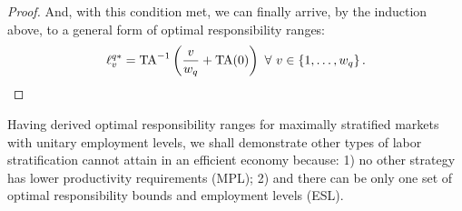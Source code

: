 \documentclass[hidelinks, nonatbib]{elsarticle}
\begin{document}
\begin{lemma}
\begin{proof}
        And, with this condition met, we can finally arrive, by the induction above, to a general form of optimal responsibility ranges:
        \begin{gather}
        \ell_{v}^{q*}
        =
        \text{TA}^{-1}\left(
            \frac{v}{w_q}
            +
            \text{TA}(0)
        \right)
        \
        \forall
        \
        v \in 
        \left\{
            1, \dots, w_q
        \right\}
        .
        \end{gather}    
    \end{proof}
\end{lemma}

Having derived optimal responsibility ranges for maximally stratified markets with unitary employment levels, we shall demonstrate other types of labor stratification cannot attain in an efficient economy because: 1) no other strategy has lower productivity requirements (MPL); 2) and there can be only one set of optimal responsibility bounds and employment levels (ESL).
\end{document}
